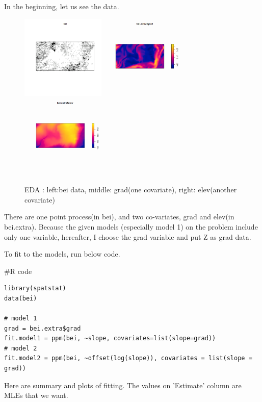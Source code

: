 \documentclass{article}
\newenvironment{Rcode}%
{%
    \begin{mdframed}
    \#R code
    \begin{small}
}
{%
    \end{small}
    \end{mdframed}
}
\begin{document}
In the beginning, let us see the data.
\begin{figure}[!h]
    \centering
    \includegraphics[width=4cm]{prob3_bei.png}
    \includegraphics[width=4cm]{prob3_grad.png}
    \includegraphics[width=4cm]{prob3_elev.png}
    \caption{EDA : left:bei data, middle: grad(one covariate), right: elev(another covariate)}
\end{figure}

There are one point process(in bei), and two co-variates, grad and elev(in bei.extra).
Because the given models (especially model 1) on the problem include only one variable,
hereafter, I choose the grad variable and put Z as grad data.

To fit to the models, run below code.

\begin{Rcode}
    \begin{verbatim}
library(spatstat)
data(bei)

# model 1
grad = bei.extra$grad
fit.model1 = ppm(bei, ~slope, covariates=list(slope=grad))
# model 2
fit.model2 = ppm(bei, ~offset(log(slope)), covariates = list(slope = grad))
    \end{verbatim}
\end{Rcode}

Here are summary and plots of fitting.
The values on 'Estimate' column are MLEs that we want.
\end{document}
